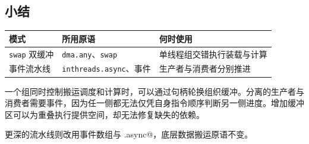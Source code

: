 \subsection*{小结}

\begin{table}[htbp]\centering\small
\begin{tabularx}{\linewidth}{@{}lXX@{}}
\toprule
\textbf{模式} & \textbf{所用原语} & \textbf{何时使用} \\
\midrule
\texttt{swap} 双缓冲 & \texttt{dma.any}、\texttt{swap} & 单线程组交错执行装载与计算 \\
事件流水线 & \texttt{inthreads.async}、事件 & 生产者与消费者分别推进 \\
\bottomrule
\end{tabularx}
\end{table}

一个组同时控制搬运调度和计算时，可以通过句柄轮换组织缓冲。分离的生产者与消费者需要事件，因为任一侧都无法仅凭自身指令顺序判断另一侧进度。增加缓冲区可以为重叠执行提供空间，却无法修复缺失的依赖。

更深的流水线则改用事件数组与 \co@inthreads.async@，底层数据搬运原语不变。
